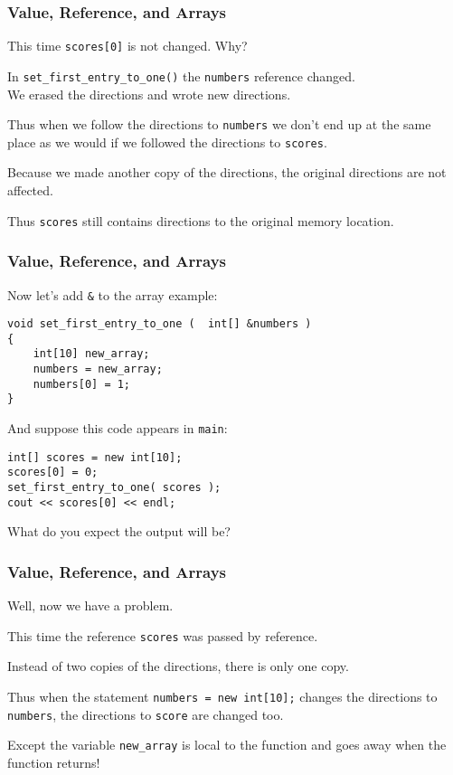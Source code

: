 \begin{frame}
\frametitle{Value, Reference, and Arrays}
This time \texttt{scores[0]} is not changed. Why?

In \texttt{set\_first\_entry\_to\_one()} the \texttt{numbers} reference changed.\\
\quad We erased the directions and wrote new directions. 

Thus when we follow the directions to \texttt{numbers} we don't end up at the same place as we would if we followed the directions to \texttt{scores}.

Because we made another copy of the directions, the original directions are not affected.

Thus \texttt{scores} still contains directions to the original memory location.

\end{frame}

\begin{frame}[fragile]
\frametitle{Value, Reference, and Arrays}

Now let's add \texttt{\&} to the array example:

\begin{verbatim}
void set_first_entry_to_one (  int[] &numbers )
{
    int[10] new_array;
    numbers = new_array;
    numbers[0] = 1;
}
\end{verbatim}

And suppose this code appears in \texttt{main}:
\begin{verbatim}
int[] scores = new int[10];
scores[0] = 0;
set_first_entry_to_one( scores );
cout << scores[0] << endl;
\end{verbatim}

What do you expect the output will be?

\end{frame}

\begin{frame}
\frametitle{Value, Reference, and Arrays}
Well, now we have a problem.

This time the reference \texttt{scores} was passed by reference.

Instead of two copies of the directions, there is only one copy.

Thus when the statement \texttt{numbers = new int[10];} changes the directions to \texttt{numbers}, the directions to \texttt{score} are changed too.

Except the variable \texttt{new\_array} is local to the function and goes away when the function returns!

\end{frame}

